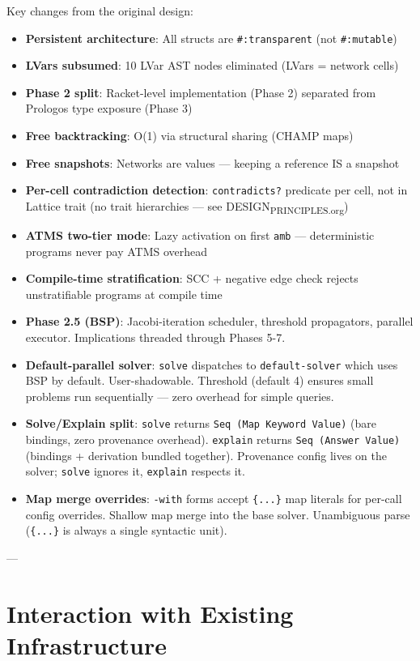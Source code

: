 \documentclass[11pt]{article}
\begin{document}
Key changes from the original design:
\begin{itemize}
\item \textbf{Persistent architecture}: All structs are \texttt{\#:transparent} (not \texttt{\#:mutable})
\item \textbf{LVars subsumed}: 10 LVar AST nodes eliminated (LVars = network cells)
\item \textbf{Phase 2 split}: Racket-level implementation (Phase 2) separated from
Prologos type exposure (Phase 3)
\item \textbf{Free backtracking}: O(1) via structural sharing (CHAMP maps)
\item \textbf{Free snapshots}: Networks are values — keeping a reference IS a snapshot
\item \textbf{Per-cell contradiction detection}: \texttt{contradicts?} predicate per cell, not
in Lattice trait (no trait hierarchies — see DESIGN\textsubscript{PRINCIPLES.org})
\item \textbf{ATMS two-tier mode}: Lazy activation on first \texttt{amb} — deterministic
programs never pay ATMS overhead
\item \textbf{Compile-time stratification}: SCC + negative edge check rejects
unstratifiable programs at compile time
\item \textbf{Phase 2.5 (BSP)}: Jacobi-iteration scheduler, threshold propagators,
parallel executor. Implications threaded through Phases 5-7.
\item \textbf{Default-parallel solver}: \texttt{solve} dispatches to \texttt{default-solver} which
uses BSP by default. User-shadowable. Threshold (default 4) ensures
small problems run sequentially — zero overhead for simple queries.
\item \textbf{Solve/Explain split}: \texttt{solve} returns \texttt{Seq (Map Keyword Value)} (bare
bindings, zero provenance overhead). \texttt{explain} returns \texttt{Seq (Answer Value)}
(bindings + derivation bundled together). Provenance config lives on the
solver; \texttt{solve} ignores it, \texttt{explain} respects it.
\item \textbf{Map merge overrides}: \texttt{-with} forms accept \texttt{\{...\}} map literals for
per-call config overrides. Shallow map merge into the base solver.
Unambiguous parse (\texttt{\{...\}} is always a single syntactic unit).
\end{itemize}

---
\section{Interaction with Existing Infrastructure}
\label{sec:org5050c18}
\end{document}
